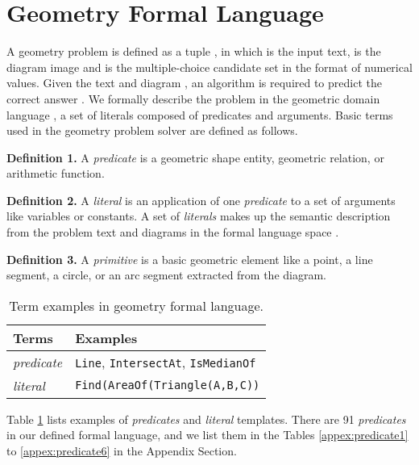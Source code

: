 \documentclass[11pt,a4paper]{article}
\begin{document}
\section{Geometry Formal Language} \label{sec:formal}

A geometry problem  is defined as a tuple , in which  is the input text,  is the diagram image and  is the multiple-choice candidate set in the format of numerical values. Given the text  and diagram , an algorithm is required to predict the correct answer . We formally describe the problem in the geometric domain language , a set of literals composed of predicates and arguments. Basic terms used in the geometry problem solver are defined as follows.

\textbf{Definition 1.} A \textit{predicate} is a geometric shape entity, geometric relation, or arithmetic function.

\textbf{Definition 2.} A \textit{literal} is an application of one \textit{predicate} to a set of arguments like variables or constants. A set of \textit{literals} makes up the semantic description from the problem text and diagrams in the formal language space .

\textbf{Definition 3.} A \textit{primitive} is a basic geometric element like a point, a line segment, a circle, or an arc segment extracted from the diagram.

\begin{table}[ht]
\centering 
\footnotesize
\begin{tabular}{l|l}
	\hline
	\textbf{Terms} & \textbf{Examples} \\
	\hline
	\textit{predicate} & \footnotesize \texttt{Line}, \texttt{IntersectAt}, \texttt{IsMedianOf} \\
	\textit{literal} & \footnotesize \texttt{Find(AreaOf(Triangle(A,B,C))} \\
	\hline
\end{tabular}
\vspace{0mm}
\caption{Term examples in geometry formal language.}
\vspace{0mm}
\label{tab1:definition}
\end{table}

Table \ref{tab1:definition} lists examples of \textit{predicates} and \textit{literal} templates. There are 91 \textit{predicates} in our defined formal language, and we list them in the Tables \ref{appex:predicate1} to \ref{appex:predicate6} in the Appendix Section.
\end{document}
